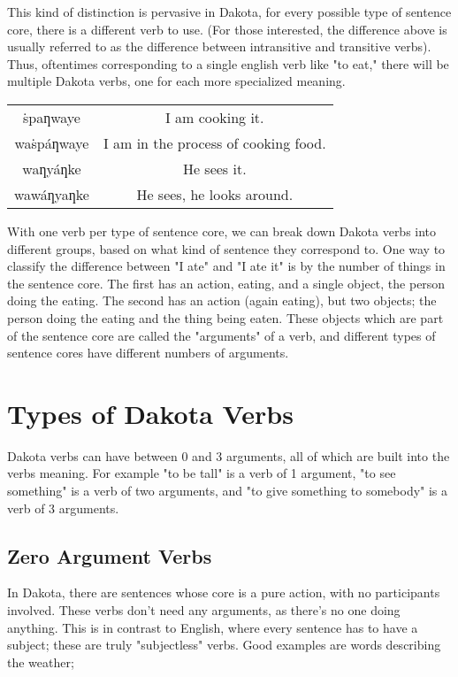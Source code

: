 \documentclass[10pt,letter]{article}
\newenvironment{BilingCol}
{\begin{center}\begin{tabular}{>{\dakota}c>{}c}

}
{\end{tabular}\end{center}}
\begin{document}
This kind of distinction is pervasive in Dakota, for every possible type of sentence core, there is a different verb to use.  (For those interested, the difference above is usually referred to as the difference between intransitive and transitive verbs).  Thus, oftentimes corresponding to a single english verb like "to eat," there will be multiple Dakota verbs, one for each more specialized meaning.

\begin{BilingCol}
   ṡpaƞwaye & I am cooking it.\\
waṡpáƞwaye& I am in the process of cooking food. \\
  waƞyáƞke& He sees it.\\
 wawáƞyaƞke & He sees, he looks around. \\
\end{BilingCol}

With one verb per type of sentence core, we can break down Dakota verbs into different groups, based on what kind of sentence they correspond to.  One way to classify the difference between "I ate" and "I ate it" is by the number of things in the sentence core.  The first has an action, eating, and a single object, the person doing the eating.  The second has an action (again eating), but two objects; the person doing the eating and the thing being eaten.  These objects which are part of the sentence core are called the "arguments" of a verb, and different types of sentence cores have different numbers of arguments.



    \section{Types of Dakota Verbs}

Dakota verbs can have between 0 and 3 arguments, all of which are built into the verbs meaning.  For example "to be tall" is a verb of 1 argument, "to see something" is a verb of two arguments, and "to give something to somebody" is a verb of 3 arguments.


	\subsection{Zero  Argument Verbs}
In Dakota, there are sentences whose core is a pure action, with no participants involved.  These verbs don't need any arguments, as there's no one doing anything.  This is in contrast to English, where every sentence has to have a subject; these are truly "subjectless" verbs.  Good examples are words describing the weather;
\end{document}
